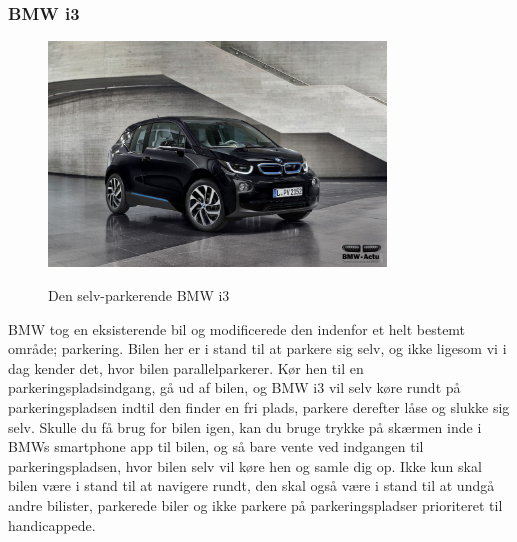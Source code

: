 \subsubsection{BMW i3}
\begin{figure}[h!]
	\centering
	\includegraphics[width=0.8\textwidth]{images/bmw-i3-fluid-black-1.jpg}
	\caption{Den selv-parkerende BMW i3}
	\cite{BMW}
	\label{fig:BMW_i3}
\end{figure}
BMW tog en eksisterende bil og modificerede den indenfor et helt bestemt område; parkering. Bilen her er i stand til at parkere sig selv, og ikke ligesom vi i dag kender det, hvor bilen parallelparkerer. Kør hen til en parkeringspladsindgang, gå ud af bilen, og BMW i3 vil selv køre rundt på parkeringspladsen indtil den finder en fri plads, parkere derefter låse og slukke sig selv. Skulle du få brug for bilen igen, kan du bruge trykke på skærmen inde i BMWs smartphone app til bilen, og så bare vente ved indgangen til parkeringspladsen, hvor bilen selv vil køre hen og samle dig op. Ikke kun skal bilen være i stand til at navigere rundt, den skal også være i stand til at undgå andre bilister, parkerede biler og ikke parkere på parkeringspladser prioriteret til handicappede.